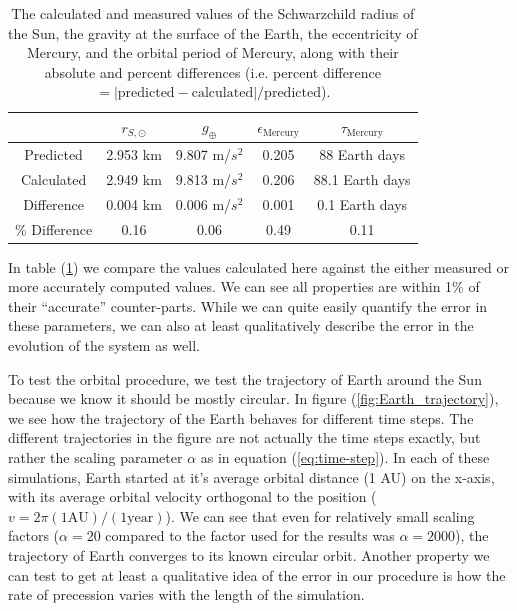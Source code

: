 \documentclass{report}
\begin{document}
            \begin{table}[h]
                \centering
                \begin{tabular}{|c||c|c|c|c|}
                    \hline
                    & $r_{S, \odot}$ & $g_\oplus$ & $\epsilon_\text{Mercury}$ & $\tau_\text{Mercury}$ \\
                    \hline
                    \hline
                    Predicted  & 2.953 km & 9.807 m/$s^2$ & 0.205 & 88 Earth days \\
                    \hline
                    Calculated & 2.949 km & 9.813 m/$s^2$ & 0.206 & 88.1 Earth days \\
                    \hline
                    Difference & 0.004 km & 0.006 m/$s^2$ & 0.001 & 0.1 Earth days \\
                    \hline
                    \% Difference & 0.16 & 0.06 & 0.49 & 0.11 \\
                    \hline
                \end{tabular}
                \caption{The calculated and measured values of the Schwarzchild radius of the Sun, the gravity at the surface of the Earth, the eccentricity of Mercury, and the orbital period of Mercury, along with their absolute and percent differences (i.e. percent difference $= |\text{predicted} - \text{calculated}| / \text{predicted}$).}
                \label{tab:val_comp}
            \end{table}
            
            In table (\ref{tab:val_comp}) we compare the values calculated here against the either measured or more accurately computed values.  We can see all properties are within 1\% of their ``accurate'' counter-parts.  While we can quite easily quantify the error in these parameters, we can also at least qualitatively describe the error in the evolution of the system as well.
            
            To test the orbital procedure, we test the trajectory of Earth around the Sun because we know it should be mostly circular.  In figure (\ref{fig:Earth_trajectory}), we see how the trajectory of the Earth behaves for different time steps.  The different trajectories in the figure are not actually the time steps exactly, but rather the scaling parameter $\alpha$ as in equation (\ref{eq:time-step}).  In each of these simulations, Earth started at it's average orbital distance (1 AU) on the x-axis, with its average orbital velocity orthogonal to the position ($v = 2 \pi (1 \mathrm{AU}) / (1 \mathrm{year})$).  We can see that even for relatively small scaling factors ($\alpha = 20$ compared to the factor used for the results was $\alpha = 2000$), the trajectory of Earth converges to its known circular orbit.  Another property we can test to get at least a qualitative idea of the error in our procedure is how the rate of precession varies with the length of the simulation.
            
\end{document}
